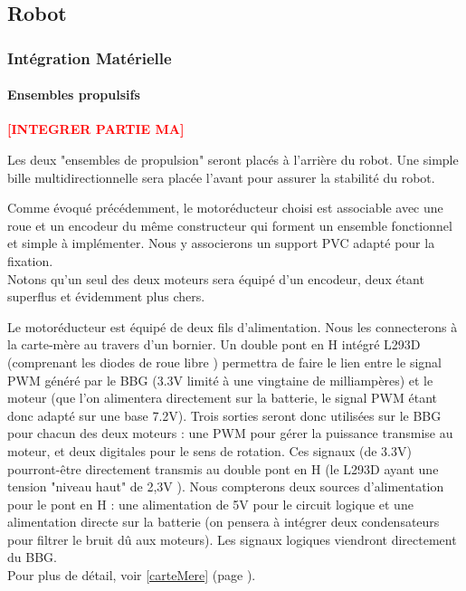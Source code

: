 \subsection{Robot}

	\subsubsection{Intégration Matérielle}

		\paragraph{Ensembles propulsifs}

			\textbf{\Huge{\textcolor{red}{[INTEGRER PARTIE MA]}}}

			Les deux "ensembles de propulsion" seront placés à l'arrière du robot. Une simple bille multidirectionnelle sera placée l'avant pour assurer la stabilité du robot.

			Comme évoqué précédemment, le motoréducteur choisi est associable avec une roue et un encodeur du même constructeur qui forment un ensemble fonctionnel et simple à implémenter. Nous y associerons un support PVC adapté pour la fixation.\\
			Notons qu'un seul des deux moteurs sera équipé d'un encodeur, deux étant superflus et évidemment plus chers.

			Le motoréducteur est équipé de deux fils d'alimentation. Nous les connecterons à la carte-mère au travers d'un bornier. Un double pont en H intégré L293D (comprenant les diodes de roue libre \cite{bib17}) permettra de faire le lien entre le signal PWM généré par le BBG (3.3V limité à une vingtaine de milliampères) et le moteur (que l'on alimentera directement sur la batterie, le signal PWM étant donc adapté sur une base 7.2V). Trois sorties seront donc utilisées sur le BBG pour chacun des deux moteurs : une PWM pour gérer la puissance transmise au moteur, et deux digitales pour le sens de rotation. Ces signaux (de 3.3V) pourront-être directement transmis au double pont en H (le L293D ayant une tension "niveau haut" de 2,3V \cite{bib17}). Nous compterons deux sources d'alimentation pour le pont en H : une alimentation de 5V pour le circuit logique et une alimentation directe sur la batterie (on pensera à intégrer deux condensateurs pour filtrer le bruit dû aux moteurs). Les signaux logiques viendront directement du BBG.\\

			Pour plus de détail, voir \ref{carteMere} (page \pageref{carteMere}).\\


